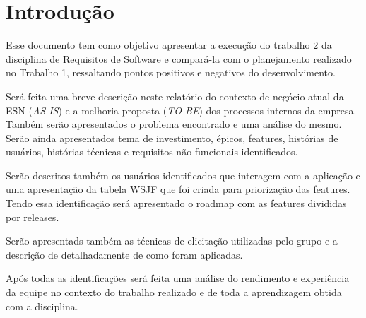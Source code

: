\section{Introdução}
	Esse documento tem como objetivo apresentar a execução do trabalho 2 da disciplina de Requisitos de Software e compará-la com o planejamento realizado no Trabalho 1, ressaltando pontos positivos e negativos do desenvolvimento.

	Será feita uma breve descrição neste relatório do contexto de negócio atual da ESN (\textit{AS-IS}) e a melhoria proposta (\textit{TO-BE}) dos processos internos da empresa. Também serão apresentados o problema encontrado e uma análise do mesmo. Serão ainda apresentados tema de investimento, épicos, features, histórias de usuários, histórias técnicas e requisitos não funcionais identificados.

	Serão descritos também os usuários identificados que interagem com a aplicação e uma apresentação da tabela WSJF que foi criada para priorização das features. Tendo essa identificação será apresentado o roadmap com as features divididas por releases.

	Serão apresentads também as técnicas de elicitação utilizadas pelo grupo e a descrição de detalhadamente de como foram aplicadas.

	Após todas as identificações será feita uma análise do rendimento e experiência da equipe no contexto do trabalho realizado e de toda a aprendizagem obtida com a disciplina.